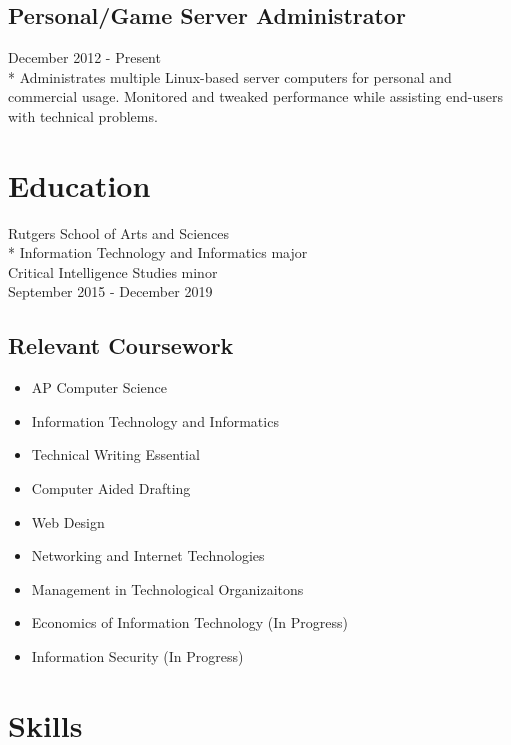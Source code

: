 \documentclass{article}
\begin{document}
\begin{multicols}{2}
\subsection{Personal/Game Server Administrator}
December 2012 - Present\\*
Administrates multiple Linux-based server computers for personal and commercial usage. Monitored and tweaked performance while assisting end-users with technical problems.  

\columnbreak

\section{Education}
Rutgers School of Arts and Sciences\\*
Information Technology and Informatics major\\
Critical Intelligence Studies minor\\
September 2015 - December 2019

\subsection{Relevant Coursework}
\begin{itemize}
\item AP Computer Science
\item Information Technology and Informatics
\item Technical Writing Essential
\item Computer Aided Drafting
\item Web Design
\item Networking and Internet Technologies
\item Management in Technological Organizaitons
\item Economics of Information Technology (In Progress)
\item Information Security (In Progress)
\end{itemize}


\section{Skills}

\iffalse
\subsection{Soft Skills}
Technical Writing/Documentation Writing, Router Configuration, Server Administration, Raspberry Pi, Arduino
\fi


\end{multicols}
\end{document}
